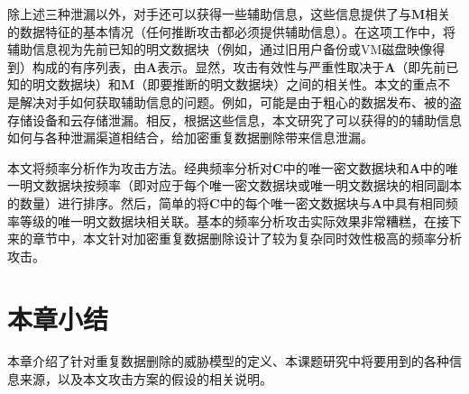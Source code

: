 除上述三种泄漏以外，对手还可以获得一些辅助信息，这些信息提供了与$\mathbf{M}$相关的数据特征的基本情况（任何推断攻击都必须提供辅助信息）。在这项工作中，将辅助信息视为先前已知的明文数据块（例如，通过旧用户备份或VM磁盘映像得到）构成的有序列表，由$\mathbf{A}$表示。显然，攻击有效性与严重性取决于$\mathbf{A}$（即先前已知的明文数据块）和$\mathbf{M}$（即要推断的明文数据块）之间的相关性。本文的重点不是解决对手如何获取辅助信息的问题。例如，可能是由于粗心的数据发布、被的盗存储设备和云存储泄漏。相反，根据这些信息，本文研究了可以获得的的辅助信息如何与各种泄漏渠道相结合，给加密重复数据删除带来信息泄漏。

本文将频率分析作为攻击方法。经典频率分析对$\mathbf{C}$中的唯一密文数据块和$\mathbf{A}$中的唯一明文数据块按频率（即对应于每个唯一密文数据块或唯一明文数据块的相同副本的数量）进行排序。然后，简单的将$\mathbf{C}$中的每个唯一密文数据块与$\mathbf{A}$中具有相同频率等级的唯一明文数据块相关联。基本的频率分析攻击实际效果非常糟糕，在接下来的章节中，本文针对加密重复数据删除设计了较为复杂同时效性极高的频率分析攻击。

\section{本章小结}

本章介绍了针对重复数据删除的威胁模型的定义、本课题研究中将要用到的各种信息来源，以及本文攻击方案的假设的相关说明。





